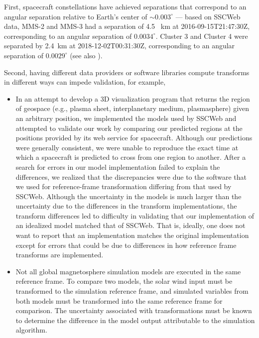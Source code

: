 \documentclass[draft]{agujournal2019}
\begin{document}
First, spacecraft constellations have achieved separations that correspond to an angular separation relative to Earth's center of ${\sim} 0.003^\circ$ --- based on SSCWeb data, MMS-2 and MMS-3 had a separation of 4.5~ km at 2016-09-15T21:47:30Z, corresponding to an angular separation of $0.0034^\circ$. Cluster 3 and Cluster 4 were separated by 2.4~km at 2018-12-02T00:31:30Z, corresponding to an angular separation of $0.0029^\circ$ (see also ).

Second, having different data providers or software libraries compute transforms in different ways can impede validation, for example, 

\begin{itemize}
\item In an attempt to develop a 3D visualization program that returns the region of geospace (e.g., plasma sheet, interplanetary medium, plasmasphere) given an arbitrary position, we implemented the models used by SSCWeb \cite{SSCWeb} and attempted to validate our work by comparing our predicted regions at the positions provided by its web service for spacecraft. Although our predictions were generally consistent, we were unable to reproduce the exact time at which a spacecraft is predicted to cross from one region to another. After a search for errors in our model implementation failed to explain the differences, we realized that the discrepancies were due to the software that we used for reference-frame transformation differing from that used by SSCWeb. Although the uncertainty in the models is much larger than the uncertainty due to the differences in the transform implementations, the transform differences led to difficulty in validating that our implementation of an idealized model matched that of SSCWeb. That is, ideally, one does not want to report that an implementation matches the original implementation except for errors that could be due to differences in how reference frame transforms are implemented.

\item Not all global magnetosphere simulation models are executed in the same reference frame. To compare two models, the solar wind input must be transformed to the simulation reference frame, and simulated variables from both models must be transformed into the same reference frame for comparison. The uncertainty associated with transformations must be known to determine the difference in the model output attributable to the simulation algorithm. 
\end{itemize}
\end{document}
